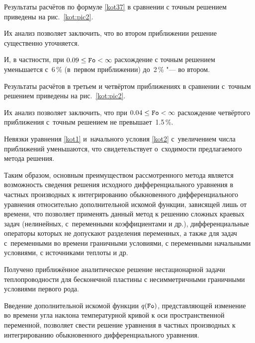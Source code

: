 






Результаты расчётов по формуле \eqref{kot37} в сравнении с точным решением~\cite{kot:bib15} приведены на рис.~\ref{kot:pic2}.

Их анализ позволяет заключить, что во втором приближении решение существенно уточняется.

И, в частности, при $0.09\le\mbox{\tt Fo}<\infty$ расхождение с точным решением уменьшается с~6\,\% (в~первом приближении) до~2\,\% "--- во втором.





Результаты расчётов в третьем и четвёртом приближениях в сравнении с~точным решением приведены на рис.~\ref{kot:pic2}.

Их анализ позволяет заключить, что при $0.04\le\mbox{\tt Fo}<\infty$ расхождение четвёртого приближения с~точным решением не превышает~1.5\,\%.

Невязки уравнения \eqref{kot1} и~начального условия \eqref{kot2} с~увеличением числа приближений уменьшаются, что свидетельствует о~сходимости предлагаемого метода решения.





Таким образом, основным преимуществом рассмотренного метода является возможность сведения решения исходного дифференциального уравнения в частных производных к интегрированию обыкновенного дифференциального уравнения относительно дополнительной искомой функции, зависящей лишь от времени, что позволяет применять данный метод к решению сложных краевых задач (нелинейных, с~переменными коэффициентами и др.), дифференциальные операторы которых не допускают разделения переменных, а также для задач с~переменными во времени граничными условиями, с переменными начальными условиями, с источниками теплоты и др.



\smallskip




Получено приближённое аналитическое решение нестационарной задачи теплопроводности для бесконечной пластины с несимметричными граничными условиями первого рода.

Введение дополнительной искомой функции $q(\mbox{\tt Fo})$, представляющей изменение во времени угла наклона температурной кривой к оси пространственной переменной, позволяет свести решение уравнения в частных производных к интегрированию обыкновенного дифференциального уравнения.

